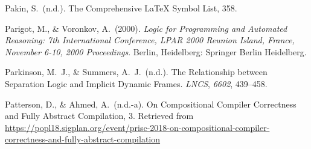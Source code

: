 \documentclass[12pt,twoside]{article}
\begin{document}
{\begin{thebibliography}{222}
\mdbibitemlabel{}Pakin, S.~(n.d.). The Comprehensive LaTeX Symbol List, 358.\label{pakin_comprehensive_nodate}%

\mdbibitemlabel{}Parigot, M., \& Voronkov, A.~(2000). \emph{Logic for Programming and Automated Reasoning: 7th International Conference, LPAR 2000 Reunion Island, France, November 6-10, 2000 Proceedings}. Berlin, Heidelberg: Springer Berlin Heidelberg.\label{parigot_logic_2000}%

\mdbibitemlabel{}Parkinson, M.~J., \& Summers, A.~J.~(n.d.). The Relationship between Separation Logic and Implicit Dynamic Frames. \emph{LNCS}, \emph{6602}, 439–458.\label{parkinson_relationship_nodate}%

\mdbibitemlabel{}Patterson, D., \& Ahmed, A.~(n.d.-a). On Compositional Compiler Correctness and Fully Abstract Compilation, 3. Retrieved from \href{https://popl18.sigplan.org/event/prisc-2018-on-compositional-compiler-correctness-and-fully-abstract-compilation}{{\ttfamily https://\hspace{0pt}popl18.\hspace{0pt}sigplan.\hspace{0pt}org/\hspace{0pt}event/\hspace{0pt}prisc-\hspace{0pt}2018-\hspace{0pt}on-\hspace{0pt}compositional-\hspace{0pt}compiler-\hspace{0pt}correctness-\hspace{0pt}and-\hspace{0pt}fully-\hspace{0pt}abstract-\hspace{0pt}compilation}}\label{patterson_compositional_nodate-1}%


\end{thebibliography}}
\end{document}

